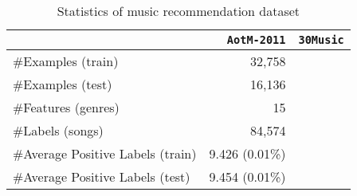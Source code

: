 \begin{table}[!h]
\centering
\caption{Statistics of music recommendation dataset}
\label{tab:dataset_music}
\begin{tabular}{l*{2}{r}} \hline \hline
                                  & \texttt{AotM-2011} & \texttt{30Music}  \\ \hline 
\#Examples (train)                & 32,758             & \\
\#Examples (test)                 & 16,136             & \\
\#Features (genres)               & 15                 & \\
\#Labels (songs)                  & 84,574             & \\
\#Average Positive Labels (train) & 9.426 (0.01\%)     & \\
\#Average Positive Labels (test)  & 9.454 (0.01\%)     & \\
\hline
\end{tabular}
\end{table}



